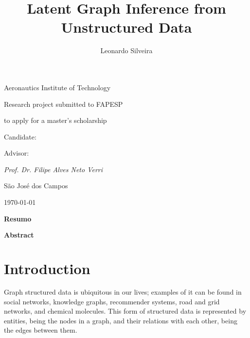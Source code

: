 \documentclass[12pt,a4paper]{article}
\title{Latent Graph Inference from Unstructured Data}
\author{Leonardo Silveira}
\begin{document}
\makeatletter
\begin{titlepage}
	{\centering Aeronautics Institute of Technology\par}
	\vspace{1.2cm}

	{\centering\Large\scshape \@title\par}
	\vspace{1cm}

	{\centering Research project submitted to FAPESP\par}
	{\centering to apply for a master's scholarship \par}
	\vspace{1cm}

	{\centering Candidate:\par}
	{\centering\large\itshape \@author\par}
	\vspace{1cm}

	{\centering Advisor:\par}
	{\centering\large\itshape Prof. Dr. Filipe Alves Neto Verri\par}

	\vfill
	{\centering São José dos Campos\par}
	{\centering \today \par}

\end{titlepage}

	\makeatother

	\tableofcontents
	\clearpage

	{\centering\large\bfseries Resumo\par}
	\vspace{0.5cm}
	

	\clearpage
	{\centering\large\bfseries Abstract\par}
	\vspace{0.5cm}
	

	\section{Introduction}
	\label{sec:introduction}

	Graph structured data is ubiquitous in our lives; examples of it can be found in social networks, knowledge graphs, recommender systems, road and grid networks, and chemical molecules. This form of structured data is represented by entities, being the nodes in a graph, and their relations with each other, being the edges between them.
\end{document}
